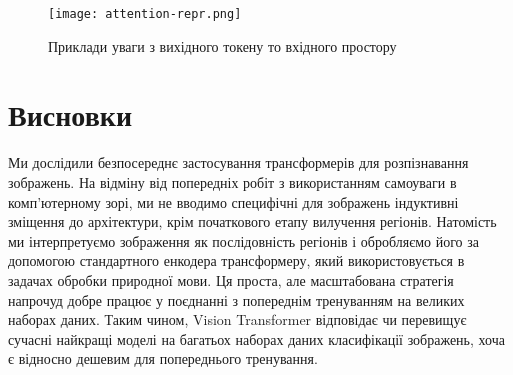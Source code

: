 \begin{figure}[H]
    \centering
    \texttt{[image: attention-repr.png]}
    \caption{Приклади уваги з вихідного токену то вхідного простору}
    \label{fig:attention-repr}
\end{figure}

\chapter*{Висновки}
Ми дослідили безпосереднє застосування трансформерів для розпізнавання
зображень. На відміну від попередніх робіт з використанням
самоуваги в комп'ютерному зорі, ми не вводимо специфічні для
зображень індуктивні зміщення до
архітектури, крім початкового етапу вилучення регіонів.
Натомість ми інтерпретуємо зображення як послідовність регіонів
і обробляємо його за допомогою стандартного енкодера трансформеру,
який використовується в задачах обробки природної мови.
Ця проста, але масштабована стратегія напрочуд добре працює у поєднанні
з попереднім тренуванням на великих наборах даних.
Таким чином, Vision Transformer відповідає чи перевищує сучасні найкращі
моделі на багатьох наборах даних класифікації зображень,
хоча є відносно дешевим для попереднього тренування.
